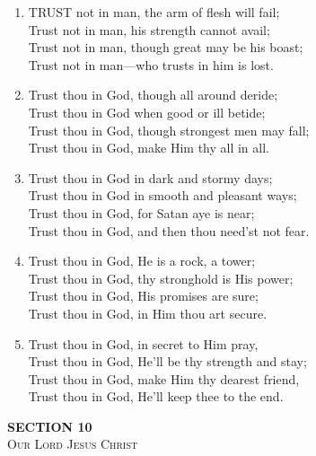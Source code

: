 \documentclass[11pt,a4paper]{article}
\begin{document}
\begin{enumerate}
    \item TRUST not in man, the arm of flesh will fail; \\
        Trust not in man, his strength cannot avail; \\
        Trust not in man, though great may be his boast; \\
        Trust not in man---who trusts in him is lost.

    \item Trust thou in God, though all around deride; \\
        Trust thou in God when good or ill betide; \\
        Trust thou in God, though strongest men may fall; \\
        Trust thou in God, make Him thy all in all.

    \item Trust thou in God in dark and stormy days; \\
        Trust thou in God in smooth and pleasant ways; \\
        Trust thou in God, for Satan aye is near; \\
        Trust thou in God, and then thou need'st not fear.

    \item Trust thou in God, He is a rock, a tower; \\
        Trust thou in God, thy stronghold is His power; \\
        Trust thou in God, His promises are sure; \\
        Trust thou in God, in Him thou art secure.

    \item Trust thou in God, in secret to Him pray, \\
        Trust thou in God, He'll be thy strength and stay; \\
        Trust thou in God, make Him thy dearest friend, \\
        Trust thou in God, He'll keep thee to the end.

\end{enumerate}

\newpage
\thispagestyle{empty}
\vspace*{3.5cm}
\begin{center}
    {\LARGE \textbf{SECTION 10}}\\[0.8em]
    {\Large \textsc{Our Lord Jesus Christ}}
\end{center}
\vspace{3.5cm}
\end{document}

